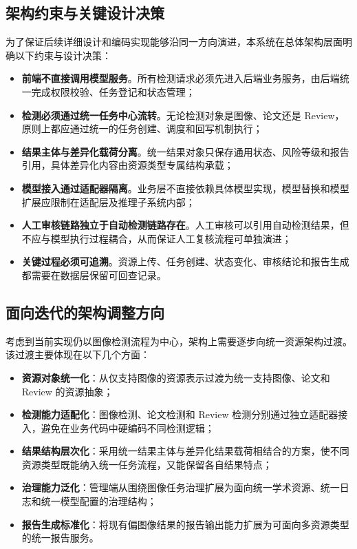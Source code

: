 \subsection{架构约束与关键设计决策}
为了保证后续详细设计和编码实现能够沿同一方向演进，本系统在总体架构层面明确以下约束与设计决策：
\begin{itemize}[leftmargin=2em]
    \item \textbf{前端不直接调用模型服务}。所有检测请求必须先进入后端业务服务，由后端统一完成权限校验、任务登记和状态管理；
    \item \textbf{检测必须通过统一任务中心流转}。无论检测对象是图像、论文还是 Review，原则上都应通过统一的任务创建、调度和回写机制执行；
    \item \textbf{结果主体与差异化载荷分离}。统一结果对象只保存通用状态、风险等级和报告引用，具体差异化内容由资源类型专属结构承载；
    \item \textbf{模型接入通过适配器隔离}。业务层不直接依赖具体模型实现，模型替换和模型扩展应限制在适配层及推理子系统内部；
    \item \textbf{人工审核链路独立于自动检测链路存在}。人工审核可以引用自动检测结果，但不应与模型执行过程耦合，从而保证人工复核流程可单独演进；
    \item \textbf{关键过程必须可追溯}。资源上传、任务创建、状态变化、审核结论和报告生成都需要在数据层保留可回查记录。
\end{itemize}

\subsection{面向迭代的架构调整方向}
考虑到当前实现仍以图像检测流程为中心，架构上需要逐步向统一资源架构过渡。该过渡主要体现在以下几个方面：
\begin{itemize}[leftmargin=2em]
    \item \textbf{资源对象统一化}：从仅支持图像的资源表示过渡为统一支持图像、论文和 Review 的资源抽象；
    \item \textbf{检测能力适配化}：图像检测、论文检测和 Review 检测分别通过独立适配器接入，避免在业务代码中硬编码不同检测逻辑；
    \item \textbf{结果结构层次化}：采用统一结果主体与差异化结果载荷相结合的方案，使不同资源类型既能纳入统一任务流程，又能保留各自结果特点；
    \item \textbf{治理能力泛化}：管理端从围绕图像任务治理扩展为面向统一学术资源、统一日志和统一模型配置的治理结构；
    \item \textbf{报告生成标准化}：将现有偏图像结果的报告输出能力扩展为可面向多资源类型的统一报告服务。
\end{itemize}

